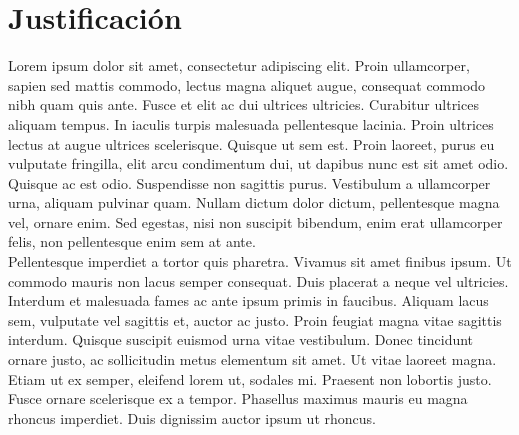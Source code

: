\documentclass[letterpaper,oneside,openany,11pt]{book}
\begin{document}

\chapter{Justificación}\label{cap.justificacion}
\noindent Lorem ipsum dolor sit amet, consectetur adipiscing elit. Proin ullamcorper, sapien sed mattis commodo, lectus magna aliquet augue, consequat commodo nibh quam quis ante. Fusce et elit ac dui ultrices ultricies. Curabitur ultrices aliquam tempus. In iaculis turpis malesuada pellentesque lacinia. Proin ultrices lectus at augue ultrices scelerisque. Quisque ut sem est. Proin laoreet, purus eu vulputate fringilla, elit arcu condimentum dui, ut dapibus nunc est sit amet odio. Quisque ac est odio. Suspendisse non sagittis purus. Vestibulum a ullamcorper urna, aliquam pulvinar quam. Nullam dictum dolor dictum, pellentesque magna vel, ornare enim. Sed egestas, nisi non suscipit bibendum, enim erat ullamcorper felis, non pellentesque enim sem at ante. \\

Pellentesque imperdiet a tortor quis pharetra. Vivamus sit amet finibus ipsum. Ut commodo mauris non lacus semper consequat. Duis placerat a neque vel ultricies. Interdum et malesuada fames ac ante ipsum primis in faucibus. Aliquam lacus sem, vulputate vel sagittis et, auctor ac justo. Proin feugiat magna vitae sagittis interdum. Quisque suscipit euismod urna vitae vestibulum. Donec tincidunt ornare justo, ac sollicitudin metus elementum sit amet. Ut vitae laoreet magna. Etiam ut ex semper, eleifend lorem ut, sodales mi. Praesent non lobortis justo. Fusce ornare scelerisque ex a tempor. Phasellus maximus mauris eu magna rhoncus imperdiet. Duis dignissim auctor ipsum ut rhoncus.


\end{document}
